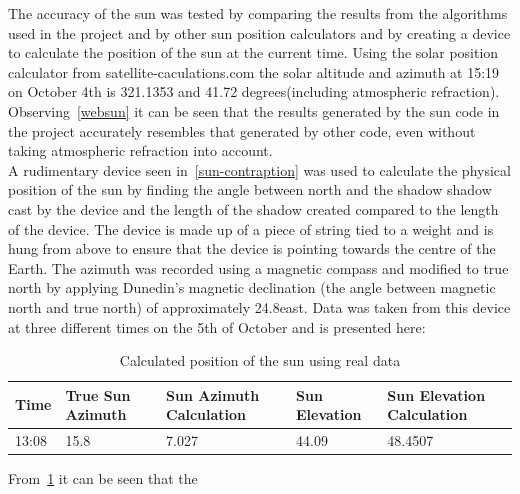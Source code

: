 \documentclass[12pt]{report}
\begin{document}
The accuracy of the sun was tested by comparing the results from the algorithms used in the project and by other sun position calculators and by creating a device to calculate the position of the sun at the current time. Using the solar position calculator from satellite-caculations.com\cite{solarpos} the solar altitude and azimuth at 15:19 on October 4th is 321.1353 and 41.72 degrees(including atmospheric refraction). Observing~\ref{websun} it can be seen that the results generated by the sun code in the project accurately resembles that generated by other code, even without taking atmospheric refraction into account.\\

A rudimentary device seen in~\ref{sun-contraption} was used to calculate the physical position of the sun by finding the angle between north and the shadow shadow cast by the device and the length of the shadow created compared to the length of the device. The device is made up of a piece of string tied to a weight and is hung from above to ensure that the device is pointing towards the centre of the Earth. The azimuth was recorded using a magnetic compass and modified to true north by applying Dunedin's magnetic declination (the angle between magnetic north and true north) of approximately 24.8\degree east. Data was taken from this device at three different times on the 5th of October and is presented here:\\

\begin{table}
\begin{tabular}{ | l | l | l | l | l}
\hline
Time & True Sun Azimuth & Sun Azimuth Calculation & Sun Elevation & Sun Elevation Calculation\\ \hline
13:08 & 15.8 & 7.027 & 44.09 & 48.4507 \\ \hline

\end{tabular}
\caption{Calculated position of the sun using real data}
\label{realsun}
\end{table}

From~\ref{realsun} it can be seen that the\\
\end{document}
